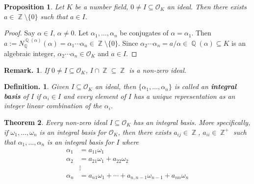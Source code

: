 \documentclass[11pt, a4paper]{memoir}
\DeclareMathOperator{\Q}{{\mathbb{Q}}}
\DeclareMathOperator{\Z}{{\mathbb{Z}}}
\theoremstyle{change}
\newtheorem{theorem}{Theorem}[section]
\newtheorem{proposition}[theorem]{Proposition}
\theoremstyle{plain}
\theoremstyle{nonumberplain}
\newtheorem{definition}{Definition.}
\newtheorem{remark}{Remark.}
\newtheorem{proof}{Proof}
\begin{document}
\begin{proposition}
    Let $K$ be a number field, $0\neq I\subseteq\mathcal{O}_K$ an ideal.
    Then there exists $a\in\Z\setminus\{0\}$ such that $a\in I$.
\end{proposition}
\begin{proof}
    Say $\alpha\in I$, $\alpha\neq 0$.
    Let $\alpha_1,\ldots,\alpha_n$ be conjugates of $\alpha=\alpha_1$.
    Then $a:=N_{\Q}^{\Q(\alpha)}(\alpha)=\alpha_1\cdots\alpha_n\in\Z\setminus\{0\}$.
    Since $\alpha_2\cdots\alpha_n=a/\alpha\in\Q(\alpha)\subseteq K$ is an algebraic integer, $\alpha_2\cdots\alpha_n\in\mathcal{O}_K$ and $a\in I$.
\end{proof}
\begin{remark}
    If $0\neq I\subseteq\mathcal{O}_K$, $I\cap\Z\subseteq\Z$ is a non-zero ideal.
\end{remark}
\begin{definition}
    Given $I\subseteq\mathcal{O}_K$ an ideal, then $\{\alpha_1,\ldots,\alpha_n\}$ is called an \textbf{integral basis} of $I$ if $\alpha_i\in I$ and every element of $I$ has a unique representation as an integer linear combination of the $\alpha_i$.
\end{definition}
\begin{theorem}
    Every non-zero ideal $I\subseteq\mathcal{O}_K$ has an integral basis.
    More specifically, if $\omega_1,\ldots,\omega_n$ is an integral basis for $\mathcal{O}_K$, then there exists $a_{ij}\in\Z$, $a_{ii}\in\Z^+$ such that $\alpha_1,\ldots,\alpha_n$ is an integral basis for $I$ where
    \begin{align*}
        \alpha_1 &= a_{11}\omega_1\\
        \alpha_2 &= a_{21}\omega_1+a_{22}\omega_2\\
                 &\vdots\\
        \alpha_n &= a_{n1}\omega_1+\cdots+a_{n,n-1}\omega_{n-1}+a_{nn}\omega_n
    \end{align*}
\end{theorem}
\end{document}
